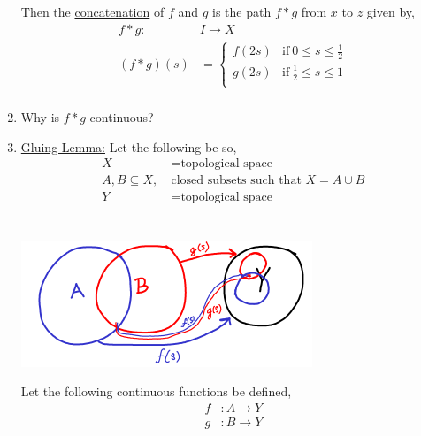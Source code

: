 \begin{enumerate}
\begin{minipage}[c]{\linewidth}
\begin{center}
                \end{center}
            \end{minipage}
            Then the \underline{concatenation} of $f$ and $g$ is the path $f*g$ from $x$ to $z$ given by,
            \begin{align*}
                f*g: &I \rightarrow X\\
                (f*g)(s)&=\begin{cases}
                    f(2s) & \text{if}\ 0\leq s \leq \frac{1}{2}\\
                    g(2s) & \text{if}\ \frac{1}{2}\leq s \leq 1\\
                \end{cases}\\
            \end{align*}
        \item Why is $f*g$ continuous?\\
        \newpage
        \item \underline{Gluing Lemma:} Let the following be so,
            \begin{align*}
                X &= \text{topological space}\\
                A,B \subseteq X,\ &\text{closed subsets such that } X=A\cup B\\
                Y &= \text{topological space}\\
            \end{align*}\\
                \begin{minipage}[c]{\linewidth}
                    \begin{center}
                    \includegraphics[]{images/gluing_lemma_2.png}
                    \end{center}
                \end{minipage}
            Let the following continuous functions be defined,
            \begin{align*}
                f&: A \rightarrow Y\\
                g&: B \rightarrow Y\\

\end{align*}
\end{enumerate}
